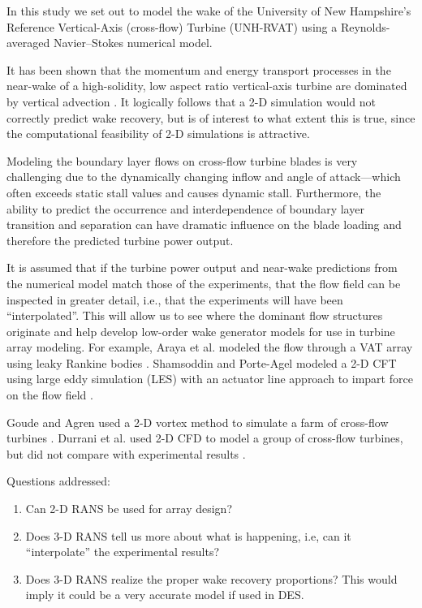 \documentclass[aip,graphicx]{revtex4-1}
\begin{document}
In this study we set out to model the wake of the University of New Hampshire's
Reference Vertical-Axis (cross-flow) Turbine (UNH-RVAT) using a
Reynolds-averaged Navier--Stokes numerical model.

It has been shown that the momentum and energy transport processes in the
near-wake of a high-solidity, low aspect ratio vertical-axis turbine are
dominated by vertical advection \cite{Bachant2015-JoT}. It logically follows
that a 2-D simulation would not correctly predict wake recovery, but is of
interest to what extent this is true, since the computational feasibility of 2-D
simulations is attractive.

Modeling the boundary layer flows on cross-flow turbine blades is very
challenging due to the dynamically changing inflow and angle of attack---which
often exceeds static stall values and causes dynamic stall. Furthermore, the
ability to predict the occurrence and interdependence of boundary layer
transition and separation can have dramatic influence on the blade loading and
therefore the predicted turbine power output.

It is assumed that if the turbine power output and near-wake predictions from
the numerical model match those of the experiments, that the flow field can be
inspected in greater detail, i.e., that the experiments will have been
``interpolated''. This will allow us to see where the dominant flow structures
originate and help develop low-order wake generator models for use in turbine
array modeling. For example, Araya et al. modeled the flow through a VAT array
using leaky Rankine bodies \cite{Araya2014}. Shamsoddin and Porte-Agel modeled a
2-D CFT using large eddy simulation (LES) with an actuator line approach to
impart force on the flow field \cite{Shamsoddin2014}. 

Goude and Agren used a 2-D vortex method to simulate a farm of cross-flow
turbines \cite{Goude2010}. Durrani et al. used 2-D CFD to model a group of
cross-flow turbines, but did not compare with experimental results
\cite{Durrani2011}.

Questions addressed:

\begin{enumerate}

    \item Can 2-D RANS be used for array design?

    \item Does 3-D RANS tell us more about what is happening, i.e, can it
    ``interpolate'' the experimental results?
    
    \item Does 3-D RANS realize the proper wake recovery proportions? This would
    imply it could be a very accurate model if used in DES.

\end{enumerate}
\end{document}
